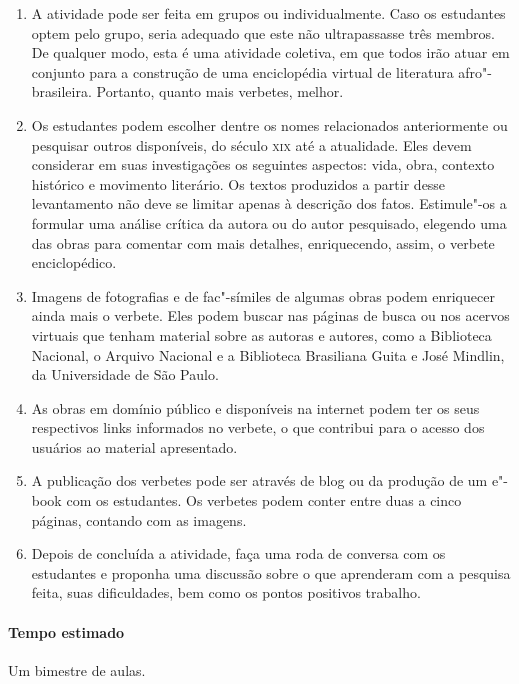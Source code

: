 \documentclass[12pt]{extarticle}
\begin{document}
\begin{enumerate}
\item
A atividade pode ser feita em grupos ou
individualmente. Caso os estudantes optem pelo grupo, seria adequado que
este não ultrapassasse três membros. De qualquer modo, esta é uma
atividade coletiva, em que todos irão atuar em conjunto para a
construção de uma enciclopédia virtual de literatura afro"-brasileira.
Portanto, quanto mais verbetes, melhor.

\item
Os estudantes podem escolher dentre os nomes relacionados
anteriormente ou pesquisar outros disponíveis, do século \textsc{xix} até a
atualidade. Eles devem considerar em suas investigações os seguintes
aspectos: vida, obra, contexto histórico e movimento literário. Os
textos produzidos a partir desse levantamento não deve se limitar apenas
à descrição dos fatos. Estimule"-os a formular uma análise crítica da
autora ou do autor pesquisado, elegendo uma das obras para comentar com
mais detalhes, enriquecendo, assim, o verbete enciclopédico.

\item
Imagens de fotografias e de fac"-símiles de algumas obras podem
enriquecer ainda mais o verbete. Eles podem buscar nas páginas de busca
ou nos acervos virtuais que tenham material sobre as autoras e autores,
como a Biblioteca Nacional, o Arquivo Nacional e a Biblioteca Brasiliana
Guita e José Mindlin, da Universidade de São Paulo.

\item
As obras em domínio público e disponíveis na internet podem ter os
seus respectivos links informados no verbete, o que contribui para o
acesso dos usuários ao material apresentado.

\item
A publicação dos verbetes pode ser através de blog ou da produção de
um e"-book com os estudantes. Os verbetes podem conter entre duas a cinco
páginas, contando com as imagens.

\item
Depois de concluída a atividade, faça uma roda de conversa com os
estudantes e proponha uma discussão sobre o que aprenderam com a
pesquisa feita, suas dificuldades, bem como os pontos positivos
trabalho.
\end{enumerate}

\paragraph{Tempo estimado} Um bimestre de aulas.
\end{document}
